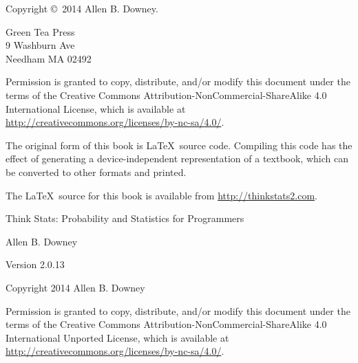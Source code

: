 \documentclass[12pt]{book}
\newcommand{\thetitle}{Think Stats: Probability and Statistics for Programmers}
\newcommand{\theversion}{2.0.13}
\begin{document}
\begin{latexonly}
\begin{flushright}
\vfill

\end{flushright}


\pagebreak
\thispagestyle{empty}

{\small
Copyright \copyright ~2014 Allen B. Downey.


\vspace{0.2in}

\begin{flushleft}
Green Tea Press       \\
9 Washburn Ave \\
Needham MA 02492
\end{flushleft}

Permission is granted to copy, distribute, and/or modify this document
under the terms of the Creative Commons
Attribution-NonCommercial-ShareAlike 4.0 International License, which
is available at
\url{http://creativecommons.org/licenses/by-nc-sa/4.0/}.

The original form of this book is \LaTeX\ source code.  Compiling this
code has the effect of generating a device-independent representation
of a textbook, which can be converted to other formats and printed.

The \LaTeX\ source for this book is available from
\url{http://thinkstats2.com}.

\vspace{0.2in}

} %

\end{latexonly}



\begin{htmlonly}


{\Large \thetitle}

{\large Allen B. Downey}

Version \theversion

\vspace{0.25in}

Copyright 2014 Allen B. Downey

\vspace{0.25in}

Permission is granted to copy, distribute, and/or modify this document
under the terms of the Creative Commons 
Attribution-NonCommercial-ShareAlike 4.0 International
Unported License, which is available at
\url{http://creativecommons.org/licenses/by-nc-sa/4.0/}.

\setcounter{chapter}{-1}

\end{htmlonly}
\end{document}
